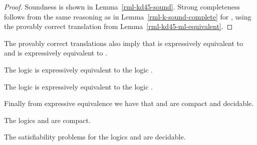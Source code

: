 \begin{proof}
Soundness is shown in Lemma~\ref{rml-kd45-sound}.
Strong completeness follows from the same reasoning as in Lemma~\ref{rml-k-sound-complete} for \axiomRmlK{}, using the provably correct translation from Lemma~\ref{rml-kd45-ml-equivalent}.
\end{proof}

The provably correct translations also imply that \logicRmlKFF{} is expressively equivalent to \logicKFF{} and \logicRmlKD{} is expressively equivalent to \logicKD{}.

\begin{corollary}
The logic \logicRmlKFF{} is expressively equivalent to the logic \logicKFF{}.
\end{corollary}

\begin{corollary}
The logic \logicRmlKD{} is expressively equivalent to the logic \logicKD{}.
\end{corollary}

Finally from expressive equivalence we have that \logicRmlKFF{} and \logicRmlKD{} are compact and decidable.

\begin{corollary}
The logics \logicRmlKFF{} and \logicRmlKD{} are compact.
\end{corollary}

\begin{corollary}
The satisfiability problems for the logics \logicRmlKFF{} and \logicRmlKD{} are decidable.
\end{corollary}
